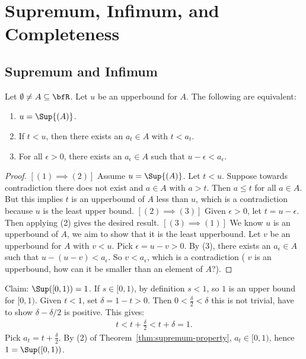 \chapter{Supremum, Infimum, and Completeness}\label{chapter:sup-inf-compl}
\vspace{12pt}

\section{Supremum and Infimum}

    \begin{theorem}\label{thm:supremum-property}
        Let $\emptyset \neq A \subseteq \bfR$. Let $u$ be an upperbound for $A$. The following are equivalent:
            \begin{enumerate}[label = (\arabic*)]
                \item $u = \Sup{(A)}$.
                \item If $t<u$, then there exists an $a_t \in A$ with $t < a_t$.
                \item For all $\epsilon > 0$, there exists an $a_\epsilon \in A$ such that $u - \epsilon < a_\epsilon$.
            \end{enumerate}
    \end{theorem}
        \begin{proof}
            $\left[(1)\implies(2)\right]$ Assume $u = \Sup{(A)}$. Let $t < u$. Suppose towards contradiction there does not exist and $a \in A$ with $a > t$. Then $a \leq t$ for all $a \in A$. But this implies $t$ is an upperbound of $A$ less than $u$, which is a contradiction because $u$ is the least upper bound. $\left[(2)\implies(3)\right]$ Given $\epsilon > 0$, let $t = u -\epsilon$. Then applying (2) gives the desired result. $\left[(3)\implies(1)\right]$ We know $u$ is an upperbound of $A$, we aim to show that it is the least upperbound. Let $v$ be an upperbound for $A$ with $ v < u$. Pick $\epsilon  = u - v > 0$. By (3), there exists an $a_\epsilon \in A$ such that $u - (u - v)  < a_\epsilon$. So $v < a_\epsilon$, which is a contradiction {\tiny( $v$ is an upperbound, how can it be smaller than an element of $A$?)}. 
        \end{proof}

    \begin{example}
        Claim: $\Sup([0,1)) = 1$. If $s \in [0,1)$, by definition $s<1$, so $1$ is an upper bound for $[0,1)$. Given $t<1$, set $\delta = 1-t > 0$. Then $0 < \frac{\delta}{2} < \delta$ {\color{red} this is not trivial, have to show $\delta - \delta/2$ is positive}. This gives:
            \begin{equation*}
            \begin{split}
                t < t+ \frac{\delta}{2} < t + \delta = 1.
            \end{split}
            \end{equation*}
        Pick $a_t = t + \frac{\delta}{2}$. By (2) of Theorem~\ref{thm:supremum-property}, $a_t \in [0,1)$, hence $1 = \Sup([0,1))$.
    \end{example}

